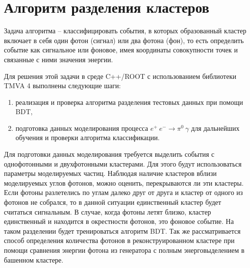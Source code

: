 \documentclass[14pt]{extarticle}
\begin{document}
\section{Алгоритм разделения кластеров}

Задача алгоритма -- классифицировать события, в которых образованный кластер включает в себя один
фотон (сигнал) или два фотона (фон), то есть определить событие как сигнальное или фоновое, имея
координаты совокупности точек и связанные с ними значения энергии.

Для решения этой задачи в среде C++/ROOT с использованием библиотеки TMVA 4 выполнены следующие шаги:
\begin{enumerate}
    \item реализация и проверка алгоритма разделения тестовых данных при помощи BDT,
    \item подготовка данных моделирования процесса $e^{+}\:e^{-} \to \pi^{0}\:\gamma$ для дальнейших обучения и проверки алгоритма классификации.
\end{enumerate}

Для подготовки данных моделирования требуется выделить события с однофотонными
и двухфотонными кластерами. Для этого будут использоваться параметры моделируемых частиц.
Наблюдая наличие кластеров вблизи моделируемых углов фотонов, можно оценить, перекрываются ли эти кластеры.
Если фотоны разлетелись по углам далеко друг от друга и кластер от одного из фотонов не собрался, то в данной ситуации единственный кластер будет считаться сигнальным. В случае, когда фотоны летят близко, кластер единственный и находится в окрестности фотонов, это фоновое событие. На таком разделении будет тренироваться алгоритм BDT.
Так же рассматривается способ определения количества фотонов в реконструированном кластере при помощи сравнения энергии фотона из генератора с полным энерговыделением в башенном кластере.
\end{document}
